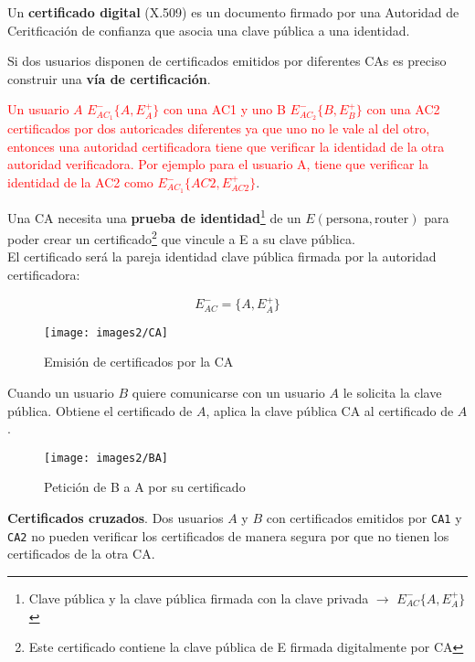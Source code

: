 \documentclass[10pt,portrait, twocolumn]{article}
\begin{document}
\quad Un \textbf{certificado digital} (X.509) es un documento firmado por una Autoridad de Ceritficación de confianza que asocia una clave pública a una identidad.

\quad Si dos usuarios disponen de certificados emitidos por diferentes CAs es preciso construir una \textbf{vía de certificación}.

\quad \textcolor{red}{Un usuario $A$ $E^{-}_{AC_{1}} \{ A, E^{+}_{A} \}$ con una AC1 y uno B $E^{-}_{AC_{2}} \{ B, E^{+}_{B} \}$ con una AC2 certificados por dos autoricades diferentes ya que uno no le vale al del otro, entonces una autoridad certificadora tiene que verificar la identidad de la otra autoridad verificadora. Por ejemplo para el usuario A, tiene que verificar la identidad de la AC2 como $E^{-}_{AC_{1}} \{ AC2, E^{+}_{AC2} \}$}.

\quad Una CA necesita una \textbf{prueba de identidad}\footnote{Clave pública y la clave pública firmada con la clave privada $\rightarrow$ $E^{-}_{AC} \{  A, E_{A}^{+} \}$} de un $E(\text{persona}, \text{router})$ para poder crear un certificado\footnote{Este certificado contiene la clave pública de E firmada digitalmente por CA} que vincule a E a su clave pública.\\

El certificado será la pareja identidad clave pública firmada por la autoridad certificadora:

\begin{equation*}
E^{-}_{AC} = \{A, E^{+} _{A}\}
\end{equation*}

	\begin{figure}[ht!]
	\centering
	\texttt{[image: images2/CA]}
	\caption{Emisión de certificados por la CA}
	\label{figure:Planta1}
	\end{figure}



	
	


Cuando un usuario $B$ quiere comunicarse con un usuario $A$ le solicita la clave pública. Obtiene el certificado de $A$, aplica la clave pública CA al certificado de $A$.

	\begin{figure}[ht!]
	\centering
	\texttt{[image: images2/BA]}
	\caption{Petición de B a A por su certificado}
	\label{figure:Planta1}
	\end{figure}
	
\textbf{Certificados cruzados}. Dos usuarios $A$ y $B$ con certificados emitidos por \texttt{CA1} y \texttt{CA2} no pueden verificar los certificados de manera segura por que no tienen los certificados de la otra CA.
\end{document}
